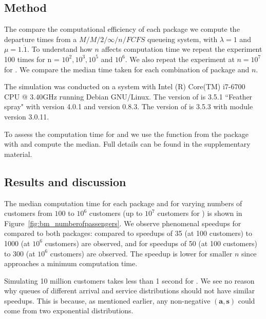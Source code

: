 \documentclass[article]{jss}
\begin{document}
\subsection{Method}

The compare the computational efficiency of each package we compute the departure times from a $M/M/2/\infty/n/FCFS$ queueing system, with $\lambda = 1$ and $\mu = 1.\dot{1}$. To understand how $n$ affects computation time we repeat the experiment 100 times for n = $ 10^2, 10^3, 10^5$ and $10^6 $. We also repeat the experiment at $n = 10^7$ for . We compare the median time taken for each combination of package and $n$. 

The simulation was conducted on a system with Intel (R) Core(TM) i7-6700 CPU @ 3.40GHz running Debian GNU/Linux. The version of  is 3.5.1 ``Feather spray" with  version 4.0.1 and  version 0.8.3. The version of  is 3.5.3 with  module version 3.0.11.

To assess the computation time for  and  we use the  function from the  package \citep{Rpkg_microbenchmark} with  and compute the median. Full details can be found in the supplementary material. 

\subsection{Results and discussion}

The median computation time for each package and for varying numbers of customers from $100$ to $10^6$ customers (up to $10^7$ customers for ) is shown in Figure~\ref{fig:bm_numberofpassengers}. We observe phenomenal speedups for  compared to both packages: compared to  speedups of 35 (at 100 customers) to 1000 (at $10^6$ customers) are observed, and for  speedups of 50 (at 100 customers) to 300 (at $10^6$ customers) are observed. The speedup is lower for smaller $n$ since  approaches a minimum computation time. 

Simulating 10 million customers takes less than 1 second for . We see no reason why queues of different arrival and service distributions should not have similar speedups. This is because, as mentioned earlier, any non-negative $\mathbf{(a,s)}$ could come from two exponential distributions. 
\end{document}
